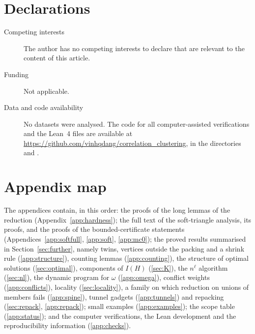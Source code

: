 \documentclass[smallextended,envcountsame,envcountsect]{svjour3}
\begin{document}
\begin{acknowledgements}
\end{acknowledgements}

\section*{Declarations}
\begin{description}
\item[Competing interests] The author has no competing interests to declare that are relevant to the content of this article.
\item[Funding] Not applicable.
\item[Data and code availability] No datasets were analysed. The code for all computer-assisted verifications and the Lean~4 files are available at \url{https://github.com/vinhqdang/correlation_clustering}, in the directories  and .
\end{description}




\appendix
\section*{Appendix map}
The appendices contain, in this order: the proofs of the long lemmas of the reduction (Appendix~\ref{app:hardness}); the full text of the soft-triangle analysis, its proofs, and the proofs of the bounded-certificate statements (Appendices~\ref{app:softfull}, \ref{app:soft}, \ref{app:mc0}); the proved results summarised in Section~\ref{sec:further}, namely twins, vertices outside the packing and a shrink rule (\ref{app:structure}), counting lemmas (\ref{app:counting}), the structure of optimal solutions (\ref{sec:optimal}), components of $I(H)$ (\ref{sec:K}), the $n^{\ell}$ algorithm (\ref{sec:nl}), the dynamic program for $\omega$ (\ref{app:omega}), conflict weights (\ref{app:conflicts}), locality (\ref{sec:locality}), a family on which reduction on unions of members fails (\ref{app:spine}), tunnel gadgets (\ref{app:tunnels}) and repacking (\ref{sec:repack}, \ref{app:repack}); small examples (\ref{app:examples}); the scope table (\ref{app:status}); and the computer verifications, the Lean development and the reproducibility information (\ref{app:checks}).



















\end{document}
